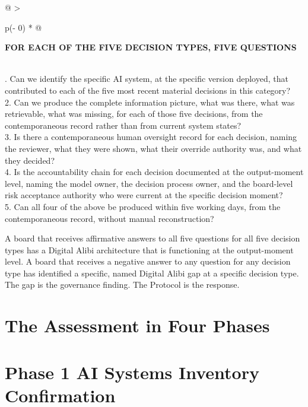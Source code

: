 \begin{longtable}[]{@{}
  >{\raggedright\arraybackslash}p{(\columnwidth - 0\tabcolsep) * }@{}}
\toprule\noalign{}
\begin{minipage}[b]{\linewidth}\raggedright
\textbf{FOR EACH OF THE FIVE DECISION TYPES, FIVE QUESTIONS}
\end{minipage} \\
\midrule\noalign{}
\endhead
\bottomrule\noalign{}
. Can we identify the specific AI system, at the specific version deployed, that contributed to each of the five most recent material decisions in this category? \\
2. Can we produce the complete information picture, what was there, what was retrievable, what was missing, for each of those five decisions, from the contemporaneous record rather than from current system states? \\
3. Is there a contemporaneous human oversight record for each decision, naming the reviewer, what they were shown, what their override authority was, and what they decided? \\
4. Is the accountability chain for each decision documented at the output-moment level, naming the model owner, the decision process owner, and the board-level risk acceptance authority who were current at the specific decision moment? \\
5. Can all four of the above be produced within five working days, from the contemporaneous record, without manual reconstruction? \\
\end{longtable}

A board that receives affirmative answers to all five questions for all five decision types has a Digital Alibi architecture that is functioning at the output-moment level. A board that receives a negative answer to any question for any decision type has identified a specific, named Digital Alibi gap at a specific decision type. The gap is the governance finding. The Protocol is the response.

\scenebreak

\section{The Assessment in Four Phases}

\section{Phase 1 AI Systems Inventory Confirmation}

